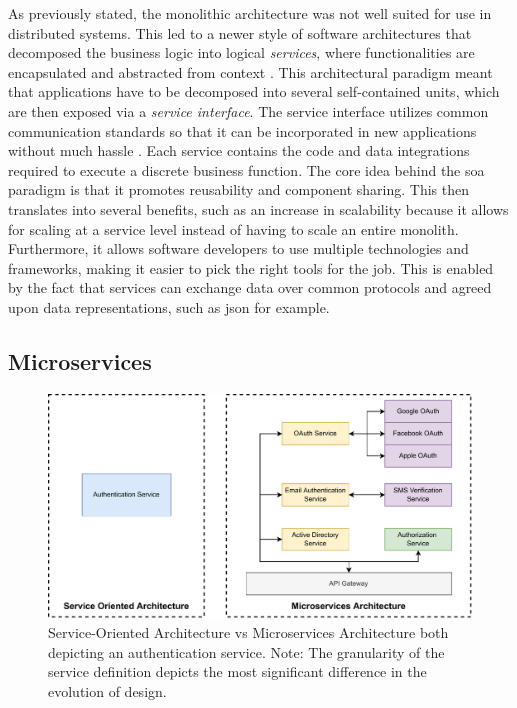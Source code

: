 As previously stated, the \gls{monolith}ic architecture was not well suited for use in distributed systems. This led to a newer style of software architectures that decomposed the business logic into  logical \textit{services}, where functionalities are encapsulated and abstracted from context \cite{perrey2003service}. This architectural paradigm meant that applications have to be decomposed into several self-contained units, which are then exposed via a \textit{service interface}. The service interface utilizes common communication standards so that it can be incorporated in new applications without much hassle \cite{ibm-soa}. Each service contains the code and data integrations required to execute a discrete business function. The core idea behind the \gls{soa} paradigm is that it promotes reusability and component sharing. This then translates into several benefits, such as an increase in scalability because it allows for scaling at a service level instead of having to scale an entire monolith. Furthermore, it allows software developers to use multiple technologies and frameworks, making it easier to pick the right tools for the job. This is enabled by the fact that services can exchange data over common protocols and agreed upon data representations, such as \gls{json} for example.


\subsection{Microservices}
\label{sec:background:soa:microservices}


\begin{figure}[!t]
    \centering
    
    \includegraphics[width=.8\linewidth]{2_background/figures/microservices-vs-soa.pdf}

    \caption[The granularity of a microservices architecture]{Service-Oriented Architecture vs Microservices Architecture both  depicting an authentication service. Note: The granularity of the service definition depicts the most significant difference in the evolution of design.}
    \label{fig:soa-vs-microservices}
\end{figure}

